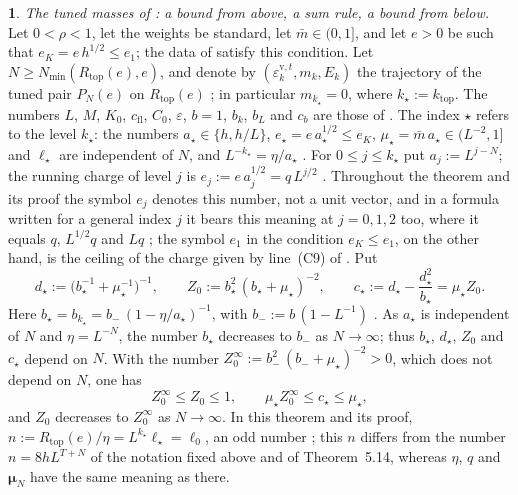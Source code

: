 \documentclass[11pt]{amsart}
\newcommand{\namedhead}{}
\theoremstyle{definition}
\newtheorem*{namedinner}{\namedhead}
\newenvironment{named}[1]{\renewcommand{\namedhead}{#1}\begin{namedinner}}{\end{namedinner}}
\begin{document}
\begin{named}{Theorem 5.16}
\emph{The tuned masses of \cite{QEDIII}: a bound from above, a sum rule, a bound from below.}
Let $0<\rho<1$, let the weights be standard, let $\bar m\in(0,1]$, and let $e>0$ be such that $e_K=e\,h^{1/2}\le e_1$;
the data of \cite[Theorem~44]{QEDIII} satisfy this condition.
Let $N\ge N_{\min}(R_{\mathrm{top}}(e),e)$, and denote by $(\varepsilon^{\mathrm v,t}_k,m_k,E_k)$ the trajectory of the tuned pair $P_N(e)$ on $R_{\mathrm{top}}(e)$ \cite[Definition before Proposition~28.3]{QEDIII};
in particular $m_{k_\star}=0$, where $k_\star:=k_{\mathrm{top}}$.
The numbers $L$, $M$, $K_0$, $c_{\mathrm{fl}}$, $C_0$, $\varepsilon$, $b=1$, $b_k$, $b_L$ and $c_b$ are those of \cite{QEDIII}.
The index $\star$ refers to the level $k_\star$:
the numbers $a_\star\in\{h,h/L\}$, $e_\star=e\,a_\star^{1/2}\le e_K$, $\mu_\star=\bar m\,a_\star\in(L^{-2},1]$ and $\ell_\star$ are independent of $N$, and $L^{-k_\star}=\eta/a_\star$ \cite[Section~G4.0.2, (Sc1), (Sc3), (Sc5); Section~I.6.1]{QEDIII}.
For $0\le j\le k_\star$ put $a_j:=L^{j-N}$;
the running charge of level $j$ is $e_j:=e\,a_j^{1/2}=q\,L^{j/2}$ \cite[Section~I.6.1]{QEDIII}.
Throughout the theorem and its proof the symbol $e_j$ denotes this number, not a unit vector, and in a formula written for a general index $j$ it bears this meaning at $j=0,1,2$ too, where it equals $q$, $L^{1/2}q$ and $Lq$ \cite[Section~I.2.5]{QEDIII};
the symbol $e_1$ in the condition $e_K\le e_1$, on the other hand, is the ceiling of the charge given by line~(C9) of \cite[Section~I.8.2]{QEDIII}.
Put
\begin{equation*}
d_\star:=\bigl(b_\star^{-1}+\mu_\star^{-1}\bigr)^{-1},\qquad Z_0:=b_\star^2\,(b_\star+\mu_\star)^{-2},\qquad c_\star:=d_\star-\frac{d_\star^2}{b_\star}=\mu_\star Z_0 .
\end{equation*}
Here $b_\star=b_{k_\star}=b_-\,(1-\eta/a_\star)^{-1}$, with $b_-:=b\,(1-L^{-1})$ \cite[Section~I.3.4]{QEDIII}.
As $a_\star$ is independent of $N$ and $\eta=L^{-N}$, the number $b_\star$ decreases to $b_-$ as $N\to\infty$;
thus $b_\star$, $d_\star$, $Z_0$ and $c_\star$ depend on $N$.
With the number $Z_0^\infty:=b_-^2\,(b_-+\mu_\star)^{-2}>0$, which does not depend on $N$, one has
\begin{equation*}
Z_0^\infty\le Z_0\le1,\qquad\mu_\star Z_0^\infty\le c_\star\le\mu_\star,
\end{equation*}
and $Z_0$ decreases to $Z_0^\infty$ as $N\to\infty$.
In this theorem and its proof, $n:=R_{\mathrm{top}}(e)/\eta=L^{k_\star}\ell_\star=\ell_0$, an odd number \cite{QEDIII};
this $n$ differs from the number $n=8hL^{T+N}$ of the notation fixed above and of Theorem~5.14, whereas $\eta$, $q$ and $\boldsymbol\mu_N$ have the same meaning as there.


\end{named}
\end{document}
